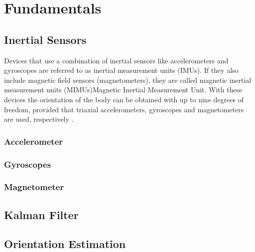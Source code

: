 \chapter{Fundamentals}
\label{ch:Fundamentals}

\section{Inertial Sensors}

Devices that use a combination of inertial sensors like accelerometers and gyroscopes are referred to as inertial measurement units (IMUs). If they also include magnetic field sensors (magnetometers), they are called magnetic inertial measurement units (MIMUs){Magnetic Inertial Measurement Unit}. With these devices the orientation of the body can be obtained with up to nine degrees of freedom, provided that triaxial accelerometers, gyroscopes and magnetometers are used, respectively \cite{olivares_vicente_signal_2013}.


\subsection{Accelerometer}


\subsection{Gyroscopes}


\subsection{Magnetometer}


\section{Kalman Filter}


\section{Orientation Estimation}